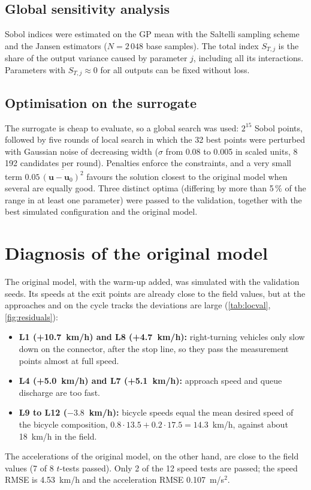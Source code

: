 \documentclass[11pt,a4paper]{article}
\newcommand{\kmh}{~km/h}
\newcommand{\mss}{~m/s$^2$}
\begin{document}
\subsection{Global sensitivity analysis}

Sobol indices were estimated on the GP mean with the Saltelli sampling scheme and the Jansen
estimators ($N = 2\,048$ base samples). The total index $S_{T,j}$ is the share of the output
variance caused by parameter $j$, including all its interactions. Parameters with
$S_{T,j}\approx 0$ for all outputs can be fixed without loss.

\subsection{Optimisation on the surrogate}

The surrogate is cheap to evaluate, so a global search was used: $2^{15}$ Sobol points, followed by
five rounds of local search in which the 32 best points were perturbed with Gaussian noise of
decreasing width ($\sigma$ from 0.08 to 0.005 in scaled units, 8\,192 candidates per round).
Penalties enforce the constraints, and a very small term $0.05\,\overline{(\mathbf u-\mathbf u_0)^2}$
favours the solution closest to the original model when several are equally good. Three distinct
optima (differing by more than 5\,\% of the range in at least one parameter) were passed to the
validation, together with the best simulated configuration and the original model.

\section{Diagnosis of the original model}
\label{sec:diagnosis}

The original model, with the warm-up added, was simulated with the validation seeds. Its speeds at
the exit points are already close to the field values, but at the approaches and on the cycle
tracks the deviations are large (\cref{tab:locval}, \cref{fig:residuals}):
\begin{itemize}
  \item \textbf{L1 (+10.7\kmh) and L8 (+4.7\kmh):} right-turning vehicles only slow down on the
        connector, after the stop line, so they pass the measurement points almost at full speed.
  \item \textbf{L4 (+5.0\kmh) and L7 (+5.1\kmh):} approach speed and queue discharge are too fast.
  \item \textbf{L9 to L12 ($-3.8$\kmh):} bicycle speeds equal the mean desired speed of the bicycle
        composition, $0.8\cdot 13.5 + 0.2\cdot 17.5 = 14.3$\kmh, against about 18\kmh{} in the
        field.
\end{itemize}
The accelerations of the original model, on the other hand, are close to the field values (7 of 8
$t$-tests passed). Only 2 of the 12 speed tests are passed; the speed RMSE is 4.53\kmh{} and the
acceleration RMSE 0.107\mss.
\end{document}
